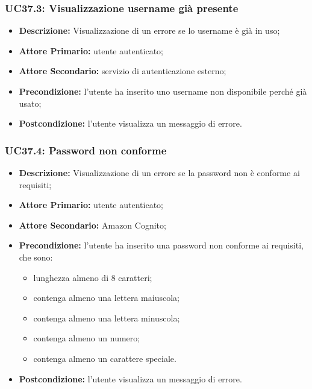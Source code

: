 \subsubsection{UC37.3: Visualizzazione username già presente}
\label{sec:UC37.3}
\begin{itemize}
    \item \textbf{Descrizione:} Visualizzazione di un errore se lo username è già in uso;
    \item \textbf{Attore Primario:} utente autenticato;
    \item \textbf{Attore Secondario:} servizio di autenticazione esterno;
    \item \textbf{Precondizione:} l'utente ha inserito uno username non disponibile perché già usato;
    \item \textbf{Postcondizione:} l'utente visualizza un messaggio di errore.
\end{itemize}

\subsubsection{UC37.4: Password non conforme}
\label{sec:UC37.4}
\begin{itemize}
    \item \textbf{Descrizione:} Visualizzazione di un errore se la password non è conforme ai requisiti;
    \item \textbf{Attore Primario:} utente autenticato;
    \item \textbf{Attore Secondario:} Amazon Cognito;
    \item \textbf{Precondizione:} l'utente ha inserito una password non conforme ai requisiti, che sono:
          \begin{itemize}
              \item lunghezza almeno di 8 caratteri;
              \item contenga almeno una lettera maiuscola;
              \item contenga almeno una lettera minuscola;
              \item contenga almeno un numero;
              \item contenga almeno un carattere speciale.
          \end{itemize}
    \item \textbf{Postcondizione:} l'utente visualizza un messaggio di errore.
\end{itemize}
